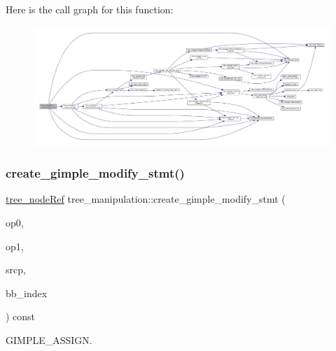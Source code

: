Here is the call graph for this function\+:
\nopagebreak
\begin{figure}[H]
\begin{center}
\leavevmode
\includegraphics[width=350pt]{d0/d99/classtree__manipulation_a5fa5ef7d4e7746cf2d6ed737e5e9ace7_cgraph}
\end{center}
\end{figure}
\mbox{\label{classtree__manipulation_adf4268da561eaa877bde497ff5e7b839}} 
\subsubsection{\texorpdfstring{create\+\_\+gimple\+\_\+modify\+\_\+stmt()}{create\_gimple\_modify\_stmt()}}
{\footnotesize\ttfamily \hyperlink{tree__node_8hpp_a6ee377554d1c4871ad66a337eaa67fd5}{tree\+\_\+node\+Ref} tree\+\_\+manipulation\+::create\+\_\+gimple\+\_\+modify\+\_\+stmt (\begin{DoxyParamCaption}\item[{const \hyperlink{tree__node_8hpp_a6ee377554d1c4871ad66a337eaa67fd5}{tree\+\_\+node\+Ref} \&}]{op0,  }\item[{const \hyperlink{tree__node_8hpp_a6ee377554d1c4871ad66a337eaa67fd5}{tree\+\_\+node\+Ref} \&}]{op1,  }\item[{const std\+::string \&}]{srcp,  }\item[{const unsigned int}]{bb\+\_\+index }\end{DoxyParamCaption}) const}



G\+I\+M\+P\+L\+E\+\_\+\+A\+S\+S\+I\+GN. 

